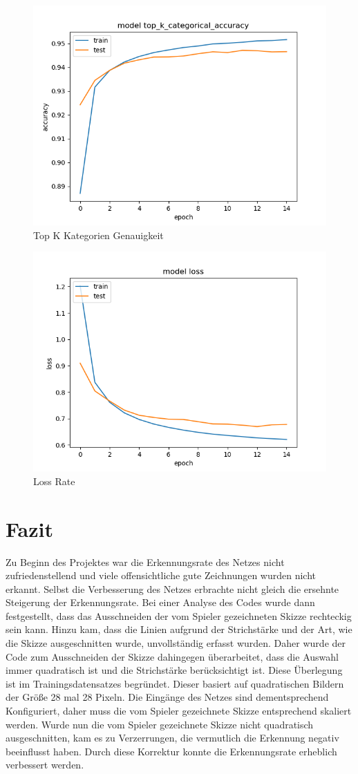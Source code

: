 \documentclass[11pt]{article}
\begin{document}
\begin{figure}[H]
	\centering
	\includegraphics[width=0.7\linewidth]{images/top_k_cat_acc}
	\caption{Top K Kategorien Genauigkeit}
	\label{fig:topkcatacc}
\end{figure}

\begin{figure}[H]
	\centering
	\includegraphics[width=0.7\linewidth]{images/loss}
	\caption{Loss Rate}
	\label{fig:loss}
\end{figure}




\section{Fazit}

Zu Beginn des Projektes war die Erkennungsrate des Netzes nicht zufriedenstellend und viele offensichtliche gute Zeichnungen wurden nicht erkannt. Selbst die Verbesserung des Netzes erbrachte nicht gleich die ersehnte Steigerung der Erkennungsrate. Bei einer Analyse des Codes wurde dann festgestellt, dass das Ausschneiden der vom Spieler gezeichneten Skizze rechteckig  sein kann. Hinzu kam, dass die Linien aufgrund der Strichstärke und der Art, wie die Skizze ausgeschnitten wurde, unvollständig erfasst wurden. 
Daher wurde der Code zum Ausschneiden der Skizze dahingegen überarbeitet, dass die Auswahl immer quadratisch ist und die Strichstärke berücksichtigt ist. 
Diese Überlegung ist im Trainingsdatensatzes begründet. Dieser basiert auf quadratischen Bildern der Größe 28 mal 28 Pixeln. Die Eingänge des Netzes sind dementsprechend Konfiguriert, daher muss die vom Spieler gezeichnete Skizze entsprechend skaliert werden. Wurde nun die vom Spieler gezeichnete Skizze nicht quadratisch ausgeschnitten, kam es zu Verzerrungen, die vermutlich die Erkennung negativ beeinflusst haben. Durch diese Korrektur konnte die Erkennungsrate erheblich verbessert werden. 
\end{document}
